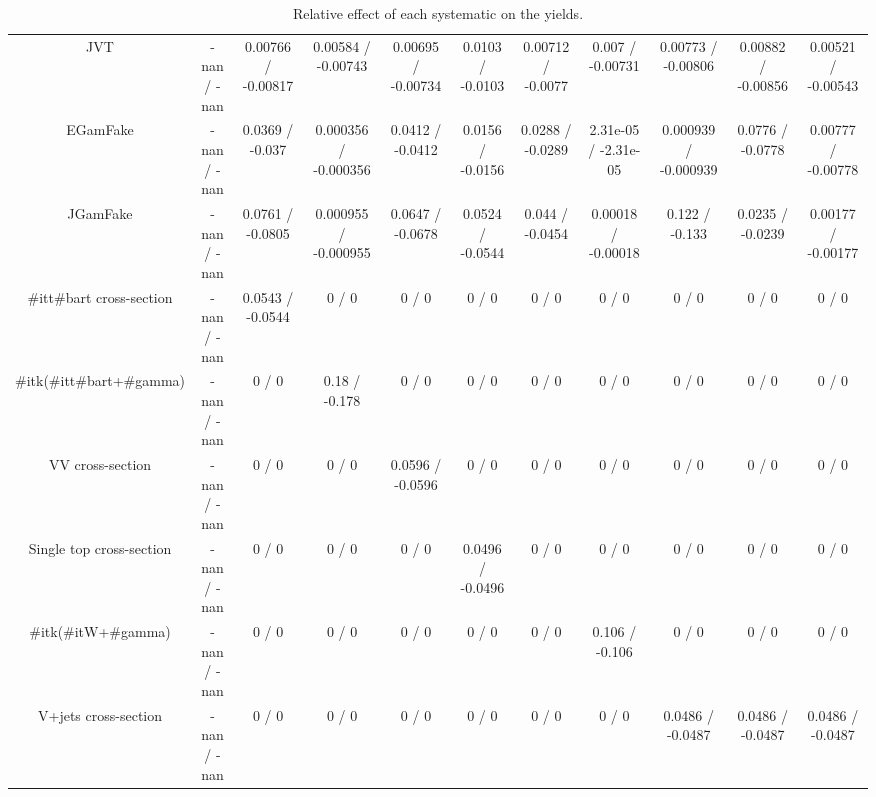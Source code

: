 \begin{table}[htbp]
\begin{center}
\begin{tabular}{|c|c|c|c|c|c|c|c|c|c|c|}
  JVT & -nan / -nan & 0.00766 / -0.00817 & 0.00584 / -0.00743 & 0.00695 / -0.00734 & 0.0103 / -0.0103 & 0.00712 / -0.0077 & 0.007 / -0.00731 & 0.00773 / -0.00806 & 0.00882 / -0.00856 & 0.00521 / -0.00543 \\ 
  EGamFake & -nan / -nan & 0.0369 / -0.037 & 0.000356 / -0.000356 & 0.0412 / -0.0412 & 0.0156 / -0.0156 & 0.0288 / -0.0289 & 2.31e-05 / -2.31e-05 & 0.000939 / -0.000939 & 0.0776 / -0.0778 & 0.00777 / -0.00778 \\ 
  JGamFake & -nan / -nan & 0.0761 / -0.0805 & 0.000955 / -0.000955 & 0.0647 / -0.0678 & 0.0524 / -0.0544 & 0.044 / -0.0454 & 0.00018 / -0.00018 & 0.122 / -0.133 & 0.0235 / -0.0239 & 0.00177 / -0.00177 \\ 
  #it{t#bar{t}} cross-section & -nan / -nan & 0.0543 / -0.0544 & 0 / 0 & 0 / 0 & 0 / 0 & 0 / 0 & 0 / 0 & 0 / 0 & 0 / 0 & 0 / 0 \\ 
  #it{k}(#it{t#bar{t}+#gamma}) & -nan / -nan & 0 / 0 & 0.18 / -0.178 & 0 / 0 & 0 / 0 & 0 / 0 & 0 / 0 & 0 / 0 & 0 / 0 & 0 / 0 \\ 
  VV cross-section & -nan / -nan & 0 / 0 & 0 / 0 & 0.0596 / -0.0596 & 0 / 0 & 0 / 0 & 0 / 0 & 0 / 0 & 0 / 0 & 0 / 0 \\ 
  Single top cross-section & -nan / -nan & 0 / 0 & 0 / 0 & 0 / 0 & 0.0496 / -0.0496 & 0 / 0 & 0 / 0 & 0 / 0 & 0 / 0 & 0 / 0 \\ 
  #it{k}(#it{W+#gamma}) & -nan / -nan & 0 / 0 & 0 / 0 & 0 / 0 & 0 / 0 & 0 / 0 & 0.106 / -0.106 & 0 / 0 & 0 / 0 & 0 / 0 \\ 
  V+jets cross-section & -nan / -nan & 0 / 0 & 0 / 0 & 0 / 0 & 0 / 0 & 0 / 0 & 0 / 0 & 0.0486 / -0.0487 & 0.0486 / -0.0487 & 0.0486 / -0.0487 \\ 
\hline 
\end{tabular} 
\caption{Relative effect of each systematic on the yields.} 
\end{center} 
\end{table} 
